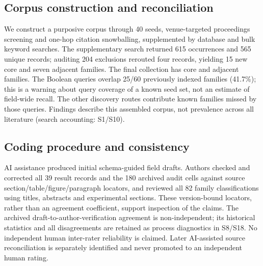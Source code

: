 \subsection{Corpus construction and reconciliation}
We construct a purposive corpus through 40 seeds, venue-targeted proceedings screening and one-hop citation snowballing, supplemented by database and bulk keyword searches. The supplementary search returned 615 occurrences and 565 unique records; auditing 204 exclusions rerouted four records, yielding 15 new core and seven adjacent families. The final collection has \FinalCore{} core and \FinalAdjacent{} adjacent families. The Boolean queries overlap 25/60 previously indexed families (41.7\%); this is a warning about query coverage of a known seed set, not an estimate of field-wide recall. The other discovery routes contribute known families missed by those queries. Findings describe this assembled corpus, not prevalence across all literature (search accounting: S1/S10).

\subsection{Coding procedure and consistency}
AI assistance produced initial schema-guided field drafts. Authors checked and corrected all 39 result records and the 180 archived audit cells against source section/table/figure/paragraph locators, and reviewed all 82 family classifications using titles, abstracts and experimental sections. These version-bound locators, rather than an agreement coefficient, support inspection of the claims. The archived draft-to-author-verification agreement is non-independent; its historical statistics and all disagreements are retained as process diagnostics in S8/S18. No independent human inter-rater reliability is claimed. Later AI-assisted source reconciliation is separately identified and never promoted to an independent human rating.

